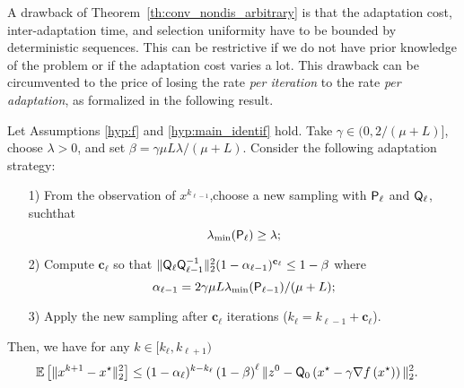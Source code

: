 {
A drawback of Theorem~\ref{th:conv_nondis_arbitrary} is that the adaptation cost, inter-adaptation time, and selection uniformity have to be bounded by deterministic sequences. This can be restrictive if we do not have prior knowledge of the problem or if the adaptation cost varies a lot. 
This drawback can be circumvented to the price of losing the rate \emph{per iteration} to the rate \emph{per adaptation}, as formalized in the following result.
        

\begin{theorem}\label{th:aggressive}
    Let Assumptions \ref{hyp:f} and  \ref{hyp:main_identif} hold. Take $\gamma\in(0,2/(\mu+L)]$, choose $\lambda>0$, and set $\beta = \gamma\mu L\lambda/(\mu+L)$. Consider the following adaptation strategy:
    \begin{itemize}
        \item[1)] From the observation of $x^{k_{\ell-1}}$\!,\;choose a new sampling with ${\mathsf{P}}_{\ell}$ and ${\mathsf{Q}}_\ell$,\,such\;that\;
        $$
        \lambda_{ \min}({\mathsf{P}}_{\ell}) \geq\lambda;
        $$
        \item[2)] Compute $\mathbf{c}_\ell$ so that $\|  {\mathsf{Q}}_\ell   {\mathsf{Q}}_{\ell-1}^{-1} \|_2^2 (1-\alpha_{\ell-1})^{\mathbf{c}_\ell} \leq 1 - \beta$ where 
        $$
        \alpha_{\ell-1} = 2\gamma \mu L \lambda_{ \min}({\mathsf{P}}_{\ell-1})/(\mu + L);
        $$
        \item[3)] Apply the new sampling %
        after $\mathbf{c}_\ell$ iterations ($k_{\ell} = k_{\ell-1}+\mathbf{c}_\ell$).
    \end{itemize}
    Then, we have for any $k\in [k_\ell,k_{\ell+1})$
    \begin{align*}
        \mathbb{E}\left[\|x^{k+1}-x^\star\|_2^2\right] &\leq (1-\alpha_\ell)^{k-k_\ell}  \left(1-\beta\right)^{\ell}  \|z^{0}-{\mathsf{Q}}_0\left(x^\star - \gamma\nabla f\left(x^\star\right)\right)\|_2^2. 
    \end{align*}
    \end{theorem}

}
